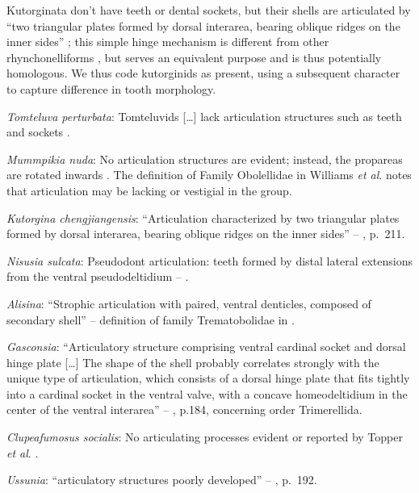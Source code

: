 \documentclass[]{book}
\theoremstyle{definition}
\theoremstyle{definition}
\theoremstyle{definition}
\theoremstyle{remark}
\begin{document}
Kutorginata don't have teeth or dental sockets, but their shells are
articulated by ``two triangular plates formed by dorsal interarea,
bearing oblique ridges on the inner sides''
\citep[p.~211]{Williams2000BrachiopodaLinguliformea}; this simple hinge
mechanism is different from other rhynchonelliforms
\citep[p.208]{Williams2000BrachiopodaLinguliformea}, but serves an
equivalent purpose and is thus potentially homologous. We thus code
kutorginids as present, using a subsequent character to capture
difference in tooth morphology.

\emph{Tomteluva perturbata}: Tomteluvids {[}\ldots{}{]} lack
articulation structures such as teeth and sockets
\citep{Streng2016Anew}.

\emph{Mummpikia nuda}: No articulation structures are evident; instead,
the propareas are rotated inwards \citep{Balthasar2008iMummpikia}. The
definition of Family Obolellidae in Williams \emph{et al}.
\citeyearpar{Williams2000BrachiopodaLinguliformea} notes that
articulation may be lacking or vestigial in the group.

\emph{Kutorgina chengjiangensis}: ``Articulation characterized by two
triangular plates formed by dorsal interarea, bearing oblique ridges on
the inner sides'' -- \citet{Williams2000BrachiopodaLinguliformea},
p.~211.

\emph{Nisusia sulcata}: Pseudodont articulation: teeth formed by distal
lateral extensions from the ventral pseudodeltidium --
\citet{Holmer2018Evolutionarysignificance}.

\emph{Alisina}: ``Strophic articulation with paired, ventral denticles,
composed of secondary shell'' -- definition of family Trematobolidae in
\citet{Williams2000BrachiopodaLinguliformea}.

\emph{Gasconsia}: ``Articulatory structure comprising ventral cardinal
socket and dorsal hinge plate {[}\ldots{}{]} The shape of the shell
probably correlates strongly with the unique type of articulation, which
consists of a dorsal hinge plate that fits tightly into a cardinal
socket in the ventral valve, with a concave homeodeltidium in the center
of the ventral interarea'' --
\citet{Williams2000BrachiopodaLinguliformea}, p.184, concerning order
Trimerellida.

\emph{Clupeafumosus socialis}: No articulating processes evident or
reported by Topper \emph{et al}. \citeyearpar{Topper2013Reappraisalof}.

\emph{Ussunia}: ``articulatory structures poorly developed'' --
\citet{Williams2000BrachiopodaLinguliformea}, p.~192.
\end{document}
